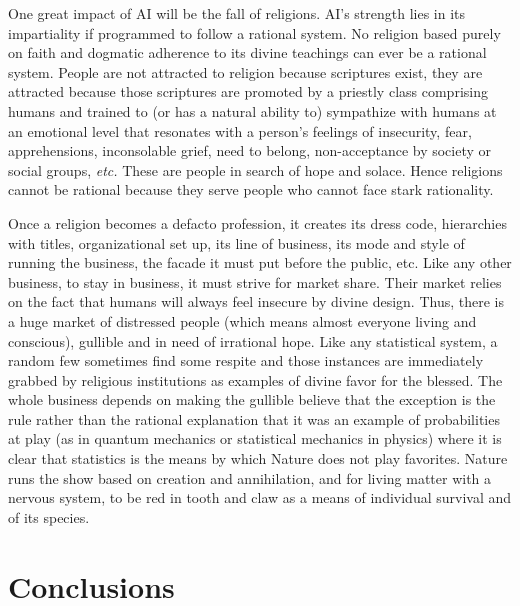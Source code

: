 \begin{multicols}{2}
One great impact of AI will be the fall of religions. AI's strength lies in its impartiality if programmed to follow a rational system. No religion based purely on faith and dogmatic adherence to its divine teachings can ever be a rational system. People are not attracted to religion because scriptures exist, they are attracted because those scriptures are promoted by a priestly class comprising humans and trained to (or has a natural ability to) sympathize with humans at an emotional level that resonates with a person's feelings of insecurity, fear, apprehensions, inconsolable grief, need to belong, non-acceptance by society or social groups, \textit{etc.} These are people in search of hope and solace. Hence religions cannot be rational because they serve people who cannot face stark rationality.

Once a religion becomes a defacto profession, it creates its dress code, hierarchies with titles, organizational set up, its line of business, its mode and style of running the business, the facade it must put before the public, etc. Like any other business, to stay in business, it must strive for market share. Their market relies on the fact that humans will always feel insecure by divine design. Thus, there is a huge market of distressed people (which means almost everyone living and conscious), gullible and in need of irrational hope. Like any statistical system, a random few sometimes find some respite and those instances are immediately grabbed by religious institutions as examples of divine favor for the blessed. The whole business depends on making the gullible believe that the exception is the rule rather than the rational explanation that it was an example of probabilities at play (as in quantum mechanics or statistical mechanics in physics) where it is clear that statistics is the means by which Nature does not play favorites. Nature runs the show based on creation and annihilation, and for living matter with a nervous system, to be red in tooth and claw as a means of individual survival and of its species.


\section{Conclusions}


\end{multicols}
